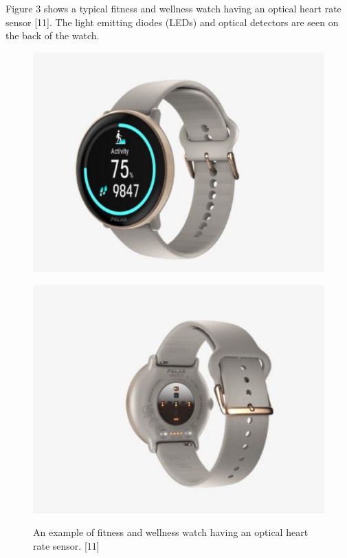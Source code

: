\documentclass{article}
\begin{document}
Figure 3 shows a typical fitness and wellness watch having an optical heart rate sensor [11].
The light emitting diodes (LEDs) and optical detectors are seen on the back of the watch.

\begin{figure}[h]
\begin{minipage}{0.5\textwidth}
\includegraphics[width=\linewidth]{watch1.png}
\label{fig:sub1}
\end{minipage}
\begin{minipage}{0.5\textwidth}
\includegraphics[width=\linewidth]{watch2.png}
\label{fig:sub2}
\end{minipage}
\caption{ An example of fitness and wellness watch having an optical heart rate sensor. [11]}
\label{fig:test}
\end{figure}
\end{document}

